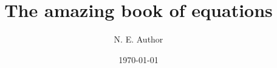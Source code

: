 \title{The amazing book of equations}
\author{N. E. Author}
\date{\today}
\publishers{The Best Publisher Ever}
